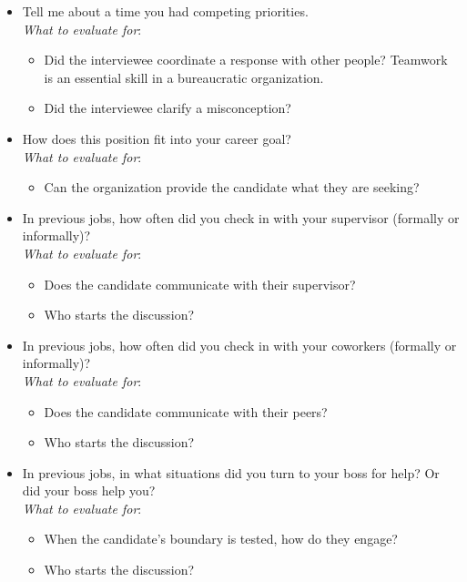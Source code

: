 \begin{itemize}
    \item Tell me about a time you had competing priorities. \\
    \textit{What to evaluate for}:
    \begin{itemize}
        \item Did the interviewee coordinate a response with other people? Teamwork is an essential skill in a bureaucratic organization.
        \item Did the interviewee clarify a misconception?
    \end{itemize}
    \item How does this position fit into your career goal?\\
    \textit{What to evaluate for}:
    \begin{itemize}
        \item Can the organization provide the candidate what they are seeking?
    \end{itemize}
    \item In previous jobs, how often did you check in with your supervisor (formally or informally)?\\
    \textit{What to evaluate for}:
    \begin{itemize}
        \item Does the candidate communicate with their supervisor? 
        \item Who starts the discussion?
    \end{itemize}
    \item In previous jobs, how often did you check in with your coworkers (formally or informally)?\\
    \textit{What to evaluate for}:
    \begin{itemize}
        \item Does the candidate communicate with their peers? 
        \item Who starts the discussion?
    \end{itemize}
    \item In previous jobs, in what situations did you turn to your boss for help? Or did your boss help you?\\
    \textit{What to evaluate for}:
    \begin{itemize}
        \item When the candidate's boundary is tested, how do they engage?
        \item Who starts the discussion?
    \end{itemize}

\end{itemize}

